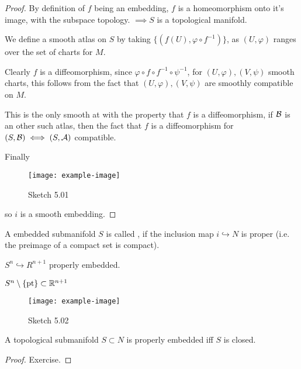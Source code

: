 \begin{proof}
    By definition of \(f\) being an embedding, \(f\) is a homeomorphism onto it's image, with the subspace topology.
    \(\implies S\) is a topological manifold. 

    We define a smooth atlas on \(S\) by taking \(\{(f(U),\varphi\circ f^{-1})\}\), as \((U,\varphi)\) ranges over the set of charts 
    for \(M\).

    Clearly \(f\) is a diffeomorphism, since \(\varphi\circ f\circ f^{-1}\circ\psi^{-1}\), for \((U,\varphi),(V,\psi)\) smooth charts, this follows 
    from the fact that \((U,\varphi),(V,\psi)\) are smoothly compatible on \(M\).

    This is the only smooth at with the property that \(f\) is a diffeomorphism, if \(\mathcal{B}\) is an other such atlas, then the fact 
    that \(f\) is a diffeomorphism for \((S,\mathcal{B})\iff (S,\mathcal{A})\) compatible.

    Finally
    \begin{figure}[H]
        \centering
        \texttt{[image: example-image]}
        \caption{Sketch 5.01}
    \end{figure}
    so \(i\) is a smooth embedding.
\end{proof} 

\begin{definition*}
    A embedded submanifold \(S\) is called , if the inclusion map 
    \(i\hookrightarrow N\) is proper (i.e. the preimage of a compact set is compact). 
\end{definition*}

\begin{example}
    \(S^n\hookrightarrow R^{n+1}\) properly embedded. 
\end{example}

\begin{example}
    \(S^n\setminus\{\text{pt}\}\subset\mathbb{R}^{n+1}\)
    \begin{figure}[H]
        \centering
        \texttt{[image: example-image]}
        \caption{Sketch 5.02}
    \end{figure}
\end{example}

\begin{lemma}\label{lem:5.2}
    A topological submanifold \(S\subset N\) is properly embedded iff 
    \(S\) is closed.
\end{lemma}

\begin{proof}
    Exercise.
\end{proof}

